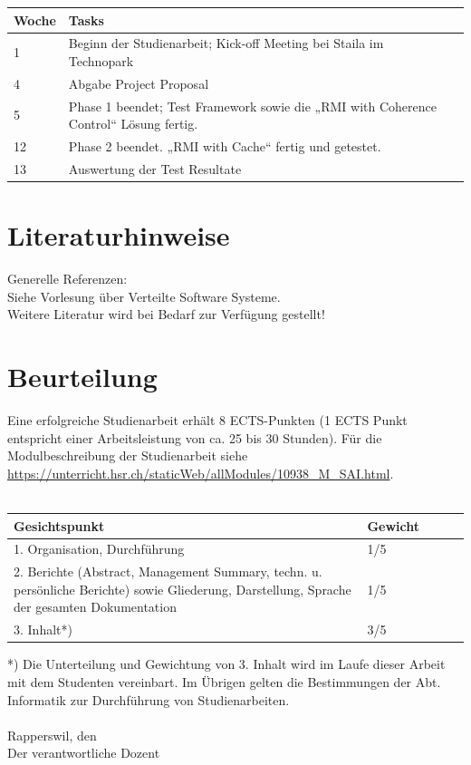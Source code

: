 \documentclass{article}
\begin{document}
\begin{tabular}{l|ll}
Woche & Tasks \\ \hline
1 & Beginn der Studienarbeit; Kick-off Meeting bei Staila im Technopark \\
4 & Abgabe Project Proposal\\
5 & Phase 1 beendet; Test Framework sowie die „RMI with Coherence Control“ Lösung fertig.\\
12 &  Phase 2 beendet. „RMI with Cache“ fertig und getestet. \\
13 & Auswertung der Test Resultate
\end{tabular}

\section{Literaturhinweise}
Generelle Referenzen:\\
Siehe Vorlesung über Verteilte Software Systeme.\\
Weitere Literatur wird bei Bedarf zur Verfügung gestellt!
\section{Beurteilung}
Eine erfolgreiche Studienarbeit erhält 8 ECTS-Punkten (1 ECTS Punkt entspricht einer Arbeitsleistung von ca. 25 bis 30 Stunden). Für die Modulbeschreibung der Studienarbeit siehe 
\url{https://unterricht.hsr.ch/staticWeb/allModules/10938_M_SAI.html}.\\ \\
\begin{tabular}{l p{3cm} l l l}
Gesichtspunkt & Gewicht \\ \hline
1. Organisation, Durchführung & 1/5 \\
2. Berichte (Abstract, Management Summary, techn. u. persönliche Berichte) sowie Gliederung, Darstellung, Sprache der gesamten Dokumentation & 1/5 \\
3. Inhalt*) & 3/5
\end{tabular}
*) Die Unterteilung und Gewichtung von 3. Inhalt wird im Laufe dieser Arbeit mit dem Studenten vereinbart. Im Übrigen gelten die Bestimmungen der Abt. Informatik zur Durchführung von Studienarbeiten.\\ \\
Rapperswil, den\\
Der verantwortliche Dozent\\
\end{document}

